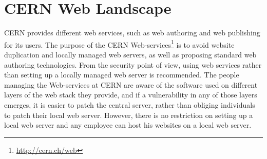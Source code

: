 \section{CERN Web Landscape}
CERN provides different web services, such as web authoring and web publishing for its users. The purpose of the CERN Web-services\footnote{\url{http://cern.ch/web}} is to avoid website duplication and locally managed web servers, as well as proposing standard web authoring technologies. From the security point of view, using web services rather than setting up a locally managed web server is recommended. The people managing the Web-services at CERN are aware of the software used on different layers of the web stack they provide, and if a vulnerability in any of those layers emerges, it is easier to patch the central server, rather than obliging individuals to patch their local web server. However, there is no restriction on setting up a local web server and any employee can host his websites on a local web server. 

